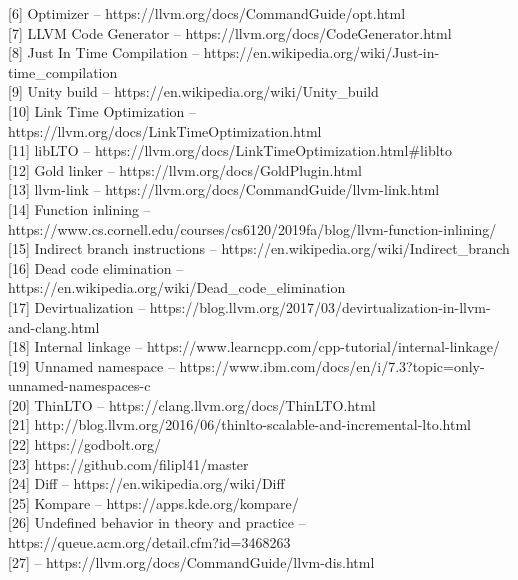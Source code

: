 \documentclass[12pt,oneside]{memoir}
\begin{document}
[6] Optimizer -- https://llvm.org/docs/CommandGuide/opt.html \\

[7] LLVM Code Generator -- https://llvm.org/docs/CodeGenerator.html \\

[8] Just In Time Compilation  -- https://en.wikipedia.org/wiki/Just-in-time{\_}compilation \\

[9] Unity build -- https://en.wikipedia.org/wiki/Unity{\_}build \\ 

[10] Link Time Optimization -- https://llvm.org/docs/LinkTimeOptimization.html \\

[11] libLTO -- https://llvm.org/docs/LinkTimeOptimization.html{\#}liblto \\

[12] Gold linker -- https://llvm.org/docs/GoldPlugin.html \\

[13] llvm-link -- https://llvm.org/docs/CommandGuide/llvm-link.html \\

[14] Function inlining -- https://www.cs.cornell.edu/courses/cs6120/2019fa/blog/llvm-function-inlining/ \\

[15] Indirect branch instructions -- https://en.wikipedia.org/wiki/Indirect{\_}branch \\

[16] Dead code elimination -- https://en.wikipedia.org/wiki/Dead{\_}code{\_}elimination \\

[17] Devirtualization -- https://blog.llvm.org/2017/03/devirtualization-in-llvm-and-clang.html \\

[18] Internal linkage -- https://www.learncpp.com/cpp-tutorial/internal-linkage/ \\

[19] Unnamed namespace -- https://www.ibm.com/docs/en/i/7.3?topic=only-unnamed-namespaces-c \\

[20] ThinLTO -- https://clang.llvm.org/docs/ThinLTO.html \\

[21] http://blog.llvm.org/2016/06/thinlto-scalable-and-incremental-lto.html \\

[22] https://godbolt.org/ \\

[23] https://github.com/filipl41/master \\

[24] Diff -- https://en.wikipedia.org/wiki/Diff \\

[25] Kompare -- https://apps.kde.org/kompare/ \\

[26] Undefined behavior in theory and practice -- https://queue.acm.org/detail.cfm?id=3468263 \\

[27] -- https://llvm.org/docs/CommandGuide/llvm-dis.html
\end{document}
